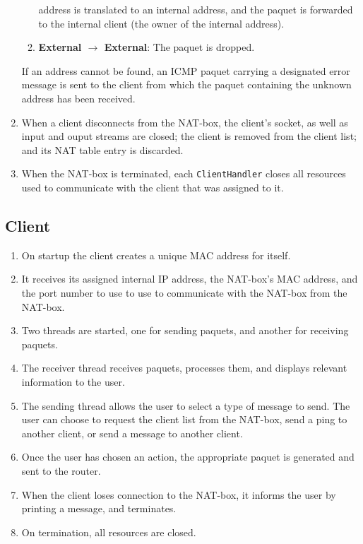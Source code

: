 \documentclass[10pt, a4paper]{article}
\begin{document}
\begin{enumerate}
\begin{enumerate}
        address is translated to an internal address, and the paquet is
        forwarded to the internal client (the owner of the internal address).
      \item \textbf{External $\rightarrow$ External}: The paquet is dropped.
    \end{enumerate}
    If an address cannot be found, an ICMP paquet carrying a designated error
    message is sent to the client from which the paquet containing the unknown
    address has been received.
  \item When a client disconnects from the NAT-box, the client's socket, as well
    as input and ouput streams are closed; the client is removed from the client
    list; and its NAT table entry is discarded.
  \item When the NAT-box is terminated, each \texttt{ClientHandler} closes all
    resources used to communicate with the client that was assigned to it.
\end{enumerate}


\subsection{Client}
\label{ssec:clipdesc}

\begin{enumerate}
  \item On startup the client creates a unique MAC address for itself.
  \item It receives its assigned internal IP address, the NAT-box's MAC address,
    and the port number to use to use to communicate with the NAT-box from the
    NAT-box.
  \item Two threads are started, one for sending paquets, and another for
    receiving paquets.
  \item The receiver thread receives paquets, processes them, and displays
    relevant information to the user.
  \item The sending thread allows the user to select a type of message to send.
    The user can choose to request the client list from the NAT-box, send a ping
    to another client, or send a message to another client.
  \item Once the user has chosen an action, the appropriate paquet is generated
    and sent to the router.
  \item When the client loses connection to the NAT-box, it informs the user by
    printing a message, and terminates.
  \item On termination, all resources are closed.
\end{enumerate}
\end{document}
